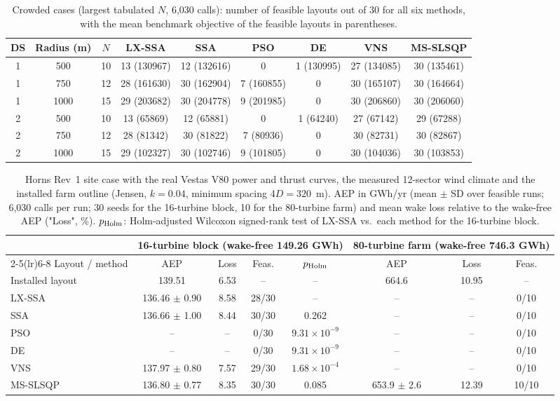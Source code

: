 \begin{table}[!t]
\centering
\caption{Crowded cases (largest tabulated $N$, 6,030 calls): number of feasible layouts out of 30 for all six methods, with the mean benchmark objective of the feasible layouts in parentheses.}
\label{tab:crowded-all}
\footnotesize\setlength{\tabcolsep}{4pt}
\begin{tabular}{ccccccccc}
\toprule
DS & Radius (m) & $N$ & LX-SSA & SSA & PSO & DE & VNS & MS-SLSQP \\
\midrule
1 & 500 & 10 & 13 (130967) & 12 (132616) & 0 & 1 (130995) & 27 (134085) & 30 (135461) \\
1 & 750 & 12 & 28 (161630) & 30 (162904) & 7 (160855) & 0 & 30 (165107) & 30 (164664) \\
1 & 1000 & 15 & 29 (203682) & 30 (204778) & 9 (201985) & 0 & 30 (206860) & 30 (206060) \\
2 & 500 & 10 & 13 (65869) & 12 (65881) & 0 & 1 (64240) & 27 (67142) & 29 (67288) \\
2 & 750 & 12 & 28 (81342) & 30 (81822) & 7 (80936) & 0 & 30 (82731) & 30 (82867) \\
2 & 1000 & 15 & 29 (102327) & 30 (102746) & 9 (101805) & 0 & 30 (104036) & 30 (103853) \\
\bottomrule
\end{tabular}
\end{table}

\begin{table}[!t]
\centering
\caption{Horns Rev~1 site case with the real Vestas V80 power and thrust curves, the measured 12-sector wind climate and the installed farm outline (Jensen, $k=0.04$, minimum spacing $4D=320$~m). AEP in GWh/yr (mean $\pm$ SD over feasible runs; 6,030 calls per run; 30 seeds for the 16-turbine block, 10 for the 80-turbine farm) and mean wake loss relative to the wake-free AEP ("Loss", \%). $p_{\rm Holm}$: Holm-adjusted Wilcoxon signed-rank test of LX-SSA vs.\ each method for the 16-turbine block.}
\label{tab:hornsrev-site}
\footnotesize\setlength{\tabcolsep}{4pt}
\begin{tabular}{lccccccc}
\toprule
& \multicolumn{4}{c}{16-turbine block (wake-free 149.26 GWh)} & \multicolumn{3}{c}{80-turbine farm (wake-free 746.3 GWh)} \\
\cmidrule(lr){2-5}\cmidrule(lr){6-8}
Layout / method & AEP & Loss & Feas. & $p_{\rm Holm}$ & AEP & Loss & Feas. \\
\midrule
Installed layout & 139.51 & 6.53 & -- & -- & 664.6 & 10.95 & -- \\
\midrule
LX-SSA & 136.46 $\pm$ 0.90 & 8.58 & 28/30 & -- & -- & -- & 0/10 \\
SSA & 136.66 $\pm$ 1.00 & 8.44 & 30/30 & 0.262 & -- & -- & 0/10 \\
PSO & -- & -- & 0/30 & $9.31\times10^{-9}$ & -- & -- & 0/10 \\
DE & -- & -- & 0/30 & $9.31\times10^{-9}$ & -- & -- & 0/10 \\
VNS & 137.97 $\pm$ 0.80 & 7.57 & 29/30 & $1.68\times10^{-4}$ & -- & -- & 0/10 \\
MS-SLSQP & 136.80 $\pm$ 0.77 & 8.35 & 30/30 & 0.085 & 653.9 $\pm$ 2.6 & 12.39 & 10/10 \\
\bottomrule
\end{tabular}
\end{table}
